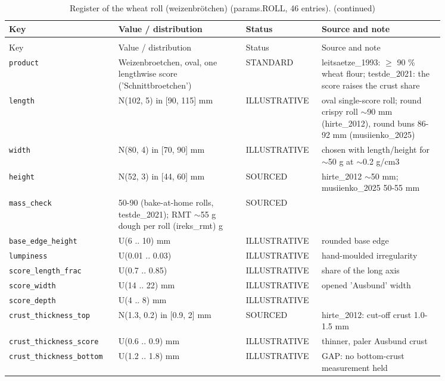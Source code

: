 \documentclass[10.5pt,a4paper]{article}
\begin{document}
{\scriptsize\begin{longtable}{@{}p{0.2\linewidth}p{0.27\linewidth}p{0.12\linewidth}p{0.26\linewidth}@{}}\caption{Register of the wheat roll (weizenbrötchen) (params.ROLL, 46 entries).}\\\toprule Key & Value / distribution & Status & Source and note \\\midrule\endfirsthead
\caption[]{Register of the wheat roll (weizenbrötchen) (params.ROLL, 46 entries). (continued)}\\\toprule Key & Value / distribution & Status & Source and note \\\midrule\endhead
\texttt{product} & Weizenbroetchen, oval, one lengthwise score ('Schnittbroetchen') & STANDARD & leitsaetze\_1993: $\ge$ 90 \% wheat flour; testde\_2021: the score raises the crust share \\
\texttt{length} & N(102, 5) in [90, 115] mm & ILLUSTRATIVE & oval single-score roll; round crispy roll $\sim$90 mm (hirte\_2012), round buns 86-92 mm (musiienko\_2025) \\
\texttt{width} & N(80, 4) in [70, 90] mm & ILLUSTRATIVE & chosen with length/height for $\sim$50 g at $\sim$0.2 g/cm3 \\
\texttt{height} & N(52, 3) in [44, 60] mm & SOURCED & hirte\_2012 $\sim$50 mm; musiienko\_2025 50-55 mm \\
\texttt{mass\_\allowbreak{}check} & 50-90 (bake-at-home rolls, testde\_2021); RMT $\sim$55 g dough per roll (ireks\_rmt) g & SOURCED &  \\
\texttt{base\_\allowbreak{}edge\_\allowbreak{}height} & U(6 .. 10) mm & ILLUSTRATIVE & rounded base edge \\
\texttt{lumpiness} & U(0.01 .. 0.03) & ILLUSTRATIVE & hand-moulded irregularity \\
\texttt{score\_\allowbreak{}length\_\allowbreak{}frac} & U(0.7 .. 0.85) & ILLUSTRATIVE & share of the long axis \\
\texttt{score\_\allowbreak{}width} & U(14 .. 22) mm & ILLUSTRATIVE & opened 'Ausbund' width \\
\texttt{score\_\allowbreak{}depth} & U(4 .. 8) mm & ILLUSTRATIVE &  \\
\texttt{crust\_\allowbreak{}thickness\_\allowbreak{}top} & N(1.3, 0.2) in [0.9, 2] mm & SOURCED & hirte\_2012: cut-off crust 1.0-1.5 mm \\
\texttt{crust\_\allowbreak{}thickness\_\allowbreak{}score} & U(0.6 .. 0.9) mm & ILLUSTRATIVE & thinner, paler Ausbund crust \\
\texttt{crust\_\allowbreak{}thickness\_\allowbreak{}bottom} & U(1.2 .. 1.8) mm & ILLUSTRATIVE & GAP: no bottom-crust measurement held \\

\end{longtable}}
\end{document}
